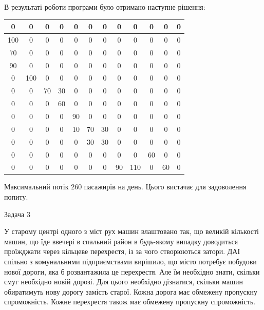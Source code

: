 \documentclass[a4paper,14pt,russian,ukrainian,oneside,final]{extreport}
\begin{document}
\indent В результаті роботи програми було отримано наступне рішення:
\begin{center}
\begin{tabular}{|c|c|c|c|c|c|c|c|c|c|c|c|}
\hline
0&0&0&0&0&0&0&0&0&0&0&0 \\ 
\hline
100&0&0&0&0&0&0&0&0&0&0&0 \\ 
\hline
70&0&0&0&0&0&0&0&0&0&0&0 \\ 
\hline
90&0&0&0&0&0&0&0&0&0&0&0 \\ 
\hline
0&100&0&0&0&0&0&0&0&0&0&0 \\ 
\hline
0&0&70&30&0&0&0&0&0&0&0&0 \\ 
\hline
0&0&0&60&0&0&0&0&0&0&0&0 \\ 
\hline
0&0&0&0&90&0&0&0&0&0&0&0 \\ 
\hline
0&0&0&0&10&70&30&0&0&0&0&0 \\ 
\hline
0&0&0&0&0&30&30&0&0&0&0&0 \\ 
\hline
0&0&0&0&0&0&0&0&0&60&0&0 \\ 
\hline
0&0&0&0&0&0&0&90&110&0&60&0 \\ 
\hline
\end{tabular}
\end{center}
Максимальний потік 260 пасажирів на день.
Цього вистачає для задоволення попиту.

Задача 3

\indent
У старому центрі одного з міст рух машин влаштовано так, що великій кількості машин, що їде ввечері в спальний район в будь-якому випадку доводиться проїжджати через кільцеве перехрестя, із за чого створюються затори. ДАІ спільно з комунальними підприємствами вирішило, що місто потребує побудови нової дороги, яка б розвантажила це перехрестя. Але їм необхідно знати, скільки смуг необхідно новій дорозі. Для цього необхідно дізнатися, скільки машин обиратимуть нову дорогу замість старої. Кожна дорога має обмежену пропускну спроможність. Кожне перехрестя також має обмежену пропускну спроможність.
\end{document}
